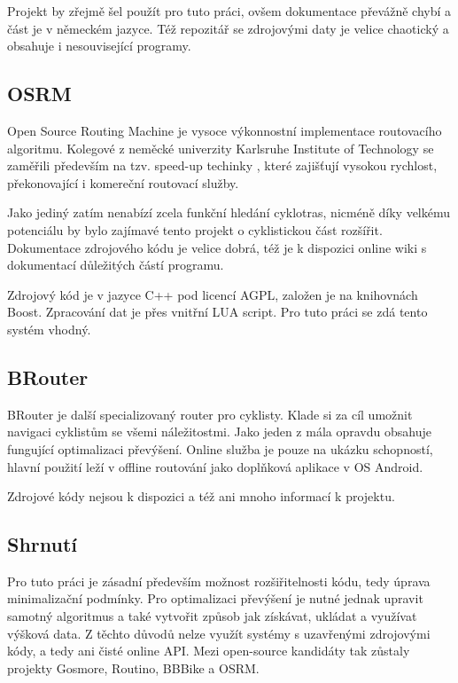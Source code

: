 \documentclass[thesis=B,czech]{FITthesis}[2012/06/26]
\begin{document}
Projekt by zřejmě šel použít pro tuto práci, ovšem dokumentace převážně chybí a část je v německém jazyce. Též repozitář se zdrojovými daty je velice chaotický a obsahuje i nesouvisející programy.

\subsection{OSRM}
Open Source Routing Machine \cite{osrm} je vysoce výkonnostní implementace routovacího algoritmu. Kolegové z neměcké univerzity Karlsruhe Institute of Technology se zaměřili především na tzv. speed-up techinky \cite{osrm-article}, které zajišťují vysokou rychlost, překonovající i komereční routovací služby.

Jako jediný zatím nenabízí zcela funkční hledání cyklotras, nicméně díky velkému potenciálu by bylo zajímavé tento projekt o cyklistickou část rozšířit. Dokumentace zdrojového kódu je velice dobrá, též je k dispozici online wiki s dokumentací důležitých částí programu.

Zdrojový kód je v jazyce C++ pod licencí AGPL, založen je na knihovnách Boost. Zpracování dat je přes vnitřní LUA script. Pro tuto práci se zdá tento systém vhodný.

\subsection{BRouter}
BRouter \cite{brouter} je další specializovaný router pro cyklisty. Klade si za cíl umožnit navigaci cyklistům se všemi náležitostmi. Jako jeden z mála opravdu obsahuje fungující optimalizaci převýšení. Online služba je pouze na ukázku schopností, hlavní použití leží v offline routování jako doplňková aplikace v OS Android.

Zdrojové kódy nejsou k dispozici a též ani mnoho informací k projektu.

\subsection{Shrnutí}
Pro tuto práci je zásadní především možnost rozšiřitelnosti kódu, tedy úprava minimalizační podmínky. Pro optimalizaci převýšení je nutné jednak upravit samotný algoritmus a také vytvořit způsob jak získávat, ukládat a využívat výšková data. Z těchto důvodů nelze využít systémy s uzavřenými zdrojovými kódy, a tedy ani čisté online API. Mezi open-source kandidáty tak zůstaly projekty Gosmore, Routino, BBBike a OSRM.
\end{document}

